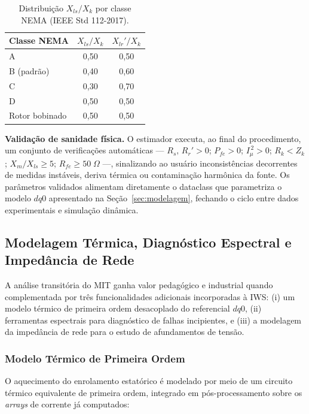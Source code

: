 \begin{table}[htbp]
\centering
\caption{Distribuição $X_{ls}/X_k$ por classe NEMA (IEEE Std 112-2017).}
\label{tab:nema_split}
\begin{tabular}{lcc}
\hline
\textbf{Classe NEMA} & $X_{ls}/X_k$ & $X_{lr}'/X_k$ \\ \hline
A & 0,50 & 0,50 \\
B (padrão) & 0,40 & 0,60 \\
C & 0,30 & 0,70 \\
D & 0,50 & 0,50 \\
Rotor bobinado & 0,50 & 0,50 \\ \hline
\end{tabular}
\end{table}

\textbf{Validação de sanidade física.} O estimador executa, ao final do procedimento, um conjunto de verificações automáticas — $R_s,\,R_r' > 0$; $P_{fe} > 0$; $I_\mu^{\,2} > 0$; $R_k < Z_k$; $X_m/X_{ls} \geq 5$; $R_{fe} \geq 50\;\Omega$ —, sinalizando ao usuário inconsistências decorrentes de medidas instáveis, deriva térmica ou contaminação harmônica da fonte. Os parâmetros validados alimentam diretamente o dataclass que parametriza o modelo $dq0$ apresentado na Seção~\ref{sec:modelagem}, fechando o ciclo entre dados experimentais e simulação dinâmica.

\subsection{Modelagem Térmica, Diagnóstico Espectral e Impedância de Rede}
\label{subsec:diagnostico}

A análise transitória do MIT ganha valor pedagógico e industrial quando complementada por três funcionalidades adicionais incorporadas à IWS: (i) um modelo térmico de primeira ordem desacoplado do referencial $dq0$, (ii) ferramentas espectrais para diagnóstico de falhas incipientes, e (iii) a modelagem da impedância de rede para o estudo de afundamentos de tensão.

\subsubsection{Modelo Térmico de Primeira Ordem}

O aquecimento do enrolamento estatórico é modelado por meio de um circuito térmico equivalente de primeira ordem, integrado em pós-processamento sobre os \textit{arrays} de corrente já computados:

